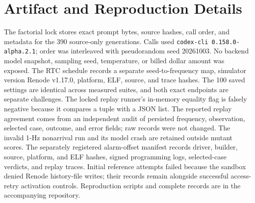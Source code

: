 \section{Artifact and Reproduction Details}\label{app:artifact}
The factorial lock stores exact prompt bytes, source hashes, call order, and metadata for the 390 source-only generations. Calls used \texttt{codex-cli 0.158.0-alpha.2.1}; order was interleaved with pseudorandom seed 20261003. No backend model snapshot, sampling seed, temperature, or billed dollar amount was exposed. The RTC schedule records a separate seed-to-frequency map, simulator version Renode v1.17.0, platform, ELF, source, and trace hashes. The 100 saved settings are identical across measured suites, and both exact endpoints are separate challenges. The locked replay runner's in-memory equality flag is falsely negative because it compares a tuple with a JSON list. The reported replay agreement comes from an independent audit of persisted frequency, observation, selected case, outcome, and error fields; raw records were not changed. The invalid 1-Hz nonarrival run and its model crash are retained outside mutant scores. The separately registered alarm-offset manifest records driver, builder, source, platform, and ELF hashes, signed programming logs, selected-case verdicts, and replay traces. Initial reference attempts failed because the sandbox denied Renode history-file writes; their records remain alongside successful access-retry activation controls. Reproduction scripts and complete records are in the accompanying repository.



